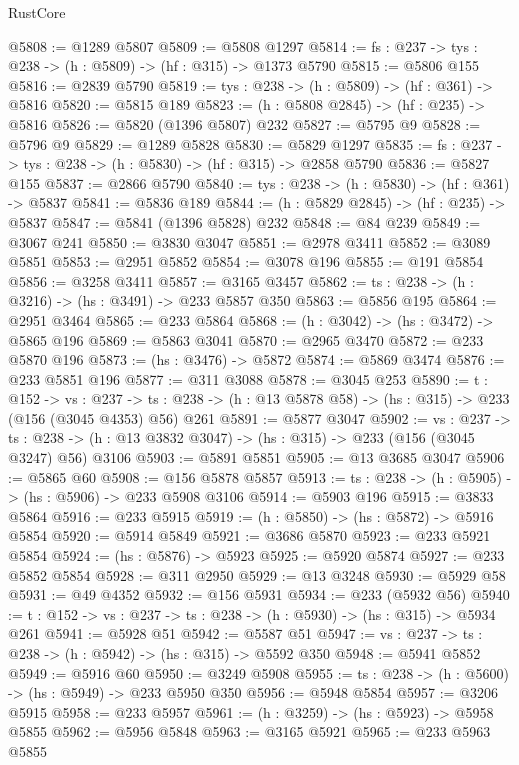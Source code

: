 \begin{lexlean}{RustCore}
\begin{coremodule}
@5808 := @1289 @5807
@5809 := @5808 @1297
@5814 := {fs : @237} -> {tys : @238} -> (h : @5809) -> (hf : @315) -> @1373 @5790
@5815 := @5806 @155
@5816 := @2839 @5790
@5819 := {tys : @238} -> (h : @5809) -> (hf : @361) -> @5816
@5820 := @5815 @189
@5823 := (h : @5808 @2845) -> (hf : @235) -> @5816
@5826 := @5820 (@1396 @5807) @232
@5827 := @5795 @9
@5828 := @5796 @9
@5829 := @1289 @5828
@5830 := @5829 @1297
@5835 := {fs : @237} -> {tys : @238} -> (h : @5830) -> (hf : @315) -> @2858 @5790
@5836 := @5827 @155
@5837 := @2866 @5790
@5840 := {tys : @238} -> (h : @5830) -> (hf : @361) -> @5837
@5841 := @5836 @189
@5844 := (h : @5829 @2845) -> (hf : @235) -> @5837
@5847 := @5841 (@1396 @5828) @232
@5848 := @84 @239
@5849 := @3067 @241
@5850 := @3830 @3047
@5851 := @2978 @3411
@5852 := @3089 @5851
@5853 := @2951 @5852
@5854 := @3078 @196
@5855 := @191 @5854
@5856 := @3258 @3411
@5857 := @3165 @3457
@5862 := {ts : @238} -> (h : @3216) -> (hs : @3491) -> @233 @5857 @350
@5863 := @5856 @195
@5864 := @2951 @3464
@5865 := @233 @5864
@5868 := (h : @3042) -> (hs : @3472) -> @5865 @196
@5869 := @5863 @3041
@5870 := @2965 @3470
@5872 := @233 @5870 @196
@5873 := (hs : @3476) -> @5872
@5874 := @5869 @3474
@5876 := @233 @5851 @196
@5877 := @311 @3088
@5878 := @3045 @253
@5890 := {t : @152} ->
  {vs : @237} ->
  {ts : @238} -> (h : @13 @5878 @58) -> (hs : @315) -> @233 (@156 (@3045 @4353) @56) @261
@5891 := @5877 @3047
@5902 := {vs : @237} ->
  {ts : @238} -> (h : @13 @3832 @3047) -> (hs : @315) -> @233 (@156 (@3045 @3247) @56) @3106
@5903 := @5891 @5851
@5905 := @13 @3685 @3047
@5906 := @5865 @60
@5908 := @156 @5878 @5857
@5913 := {ts : @238} -> (h : @5905) -> (hs : @5906) -> @233 @5908 @3106
@5914 := @5903 @196
@5915 := @3833 @5864
@5916 := @233 @5915
@5919 := (h : @5850) -> (hs : @5872) -> @5916 @5854
@5920 := @5914 @5849
@5921 := @3686 @5870
@5923 := @233 @5921 @5854
@5924 := (hs : @5876) -> @5923
@5925 := @5920 @5874
@5927 := @233 @5852 @5854
@5928 := @311 @2950
@5929 := @13 @3248
@5930 := @5929 @58
@5931 := @49 @4352
@5932 := @156 @5931
@5934 := @233 (@5932 @56)
@5940 := {t : @152} -> {vs : @237} -> {ts : @238} -> (h : @5930) -> (hs : @315) -> @5934 @261
@5941 := @5928 @51
@5942 := @5587 @51
@5947 := {vs : @237} -> {ts : @238} -> (h : @5942) -> (hs : @315) -> @5592 @350
@5948 := @5941 @5852
@5949 := @5916 @60
@5950 := @3249 @5908
@5955 := {ts : @238} -> (h : @5600) -> (hs : @5949) -> @233 @5950 @350
@5956 := @5948 @5854
@5957 := @3206 @5915
@5958 := @233 @5957
@5961 := (h : @3259) -> (hs : @5923) -> @5958 @5855
@5962 := @5956 @5848
@5963 := @3165 @5921
@5965 := @233 @5963 @5855

\end{coremodule}
\end{lexlean}
